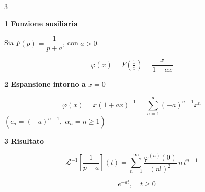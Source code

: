 \documentclass[a3paper, 12pt]{article}
\newcommand{\sectionnum}[1]{%
  \tikz[baseline=-0.5ex]\node[fill=accentBlue, text=white,
    font=\bfseries\small, inner sep=3pt, rounded corners=2pt]{#1};%
}
\begin{document}
\begin{tcolorbox}[sectionbox,
  title={\sectionnum{EX}\quad ESEMPIO ILLUSTRATIVO}]

\begin{multicols}{3}

\textbf{\color{accentGold}\textbf{1} Funzione ausiliaria}

Sia $F(p) = \dfrac{1}{p+a}$, con $a>0$.

\[
  \varphi(x) = F\!\left(\tfrac{1}{x}\right)
  = \frac{x}{1+ax}
\]

\columnbreak

\textbf{\color{accentGold}\textbf{2} Espansione intorno a $x=0$}

\[
  \varphi(x) = x(1+ax)^{-1}
  = \sum_{n=1}^{\infty}(-a)^{n-1} x^n
\]
$(c_n = (-a)^{n-1},\; \alpha_n = n \ge 1)$

\columnbreak

\textbf{\color{accentGold}\textbf{3} Risultato}

\[
  \mathcal{L}^{-1}\!\left[\frac{1}{p+a}\right]\!(t)
  = \sum_{n=1}^{\infty}\frac{\varphi^{(n)}(0)}{(n!)^2}\,n\,t^{n-1}
\]

\begin{tcolorbox}[formulabox]
\[
  = e^{-at}, \quad t \ge 0
\]
\end{tcolorbox}

\end{multicols}

\end{tcolorbox}

\vspace{0.4cm}
\end{document}
